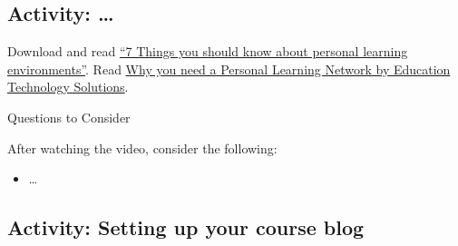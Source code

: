 \documentclass[
]{book}
\providecommand{\tightlist}{%
  \setlength{\itemsep}{0pt}\setlength{\parskip}{0pt}}
\theoremstyle{definition}
\theoremstyle{definition}
\theoremstyle{definition}
\theoremstyle{definition}
\theoremstyle{remark}
\begin{document}
\hypertarget{activity-8}{%
\subsection*{Activity: \ldots{}}\label{activity-8}}

\begin{reflect}
Download and read \href{https://library.educause.edu/resources/2009/5/7-things-you-should-know-about-personal-learning-environments}{``7 Things you should know about personal learning environments''}.
Read \href{https://educationtechnologysolutions.com/2014/07/why-you-need-a-personal-learning-network/}{Why you need a Personal Learning Network by Education Technology Solutions}.

{Questions to Consider}

After watching the video, consider the following:

\begin{itemize}
\tightlist
\item
  \ldots{}
\end{itemize}
\end{reflect}

\hypertarget{activity-setting-up-your-course-blog}{%
\subsection*{Activity: Setting up your course blog}\label{activity-setting-up-your-course-blog}}
\end{document}
